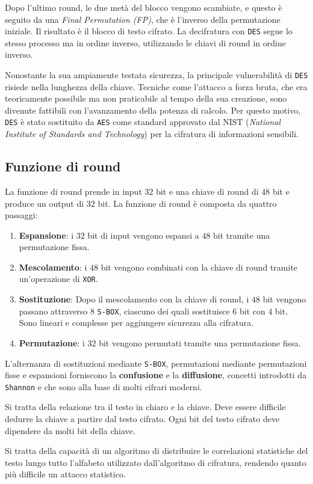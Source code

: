 Dopo l'ultimo round, le due metà del blocco vengono scambiate, e questo è seguito da una
\textit{Final Permutation (FP)}, che è l'inverso della permutazione iniziale. Il risultato
è il blocco di testo cifrato. La decifratura con \texttt{DES} segue lo stesso processo ma
in ordine inverso, utilizzando le chiavi di round in ordine inverso.

Nonostante la sua ampiamente testata sicurezza, la principale vulnerabilità di \texttt{DES}
risiede nella lunghezza della chiave. Tecniche come l'attacco a forza bruta, che era
teoricamente possibile ma non praticabile al tempo della sua creazione, sono divenute
fattibili con l'avanzamento della potenza di calcolo. Per questo motivo, \texttt{DES}
è stato sostituito da \texttt{AES} come standard approvato dal NIST (\textit{National
Institute of Standards and Technology}) per la cifratura di informazioni sensibili.
\subsection{Funzione di round}
La funzione di round prende in input $32$ bit e una chiave di round di $48$ bit e produce
un output di $32$ bit. La funzione di round è composta da quattro passaggi:
\begin{enumerate}
    \item \textbf{Espansione}: i $32$ bit di input vengono espansi a $48$ bit tramite una
    permutazione fissa.
    \item \textbf{Mescolamento}: i $48$ bit vengono combinati con la chiave di round tramite
    un'operazione di \texttt{XOR}.
    \item \textbf{Sostituzione}: Dopo il mescolamento con la chiave di round, i $48$ bit vengono
    passano attraverso $8$ \texttt{S-BOX}, ciascuno dei quali sostituisce $6$ bit con $4$ bit. 
    Sono lineari e complesse per aggiungere sicurezza alla cifratura.
    \item \textbf{Permutazione}: i $32$ bit vengono permutati tramite una permutazione fissa.
\end{enumerate}
L'alternanza di sostituzioni mediante \texttt{S-BOX}, permutazioni mediante permutazioni fisse
e espansioni forniscono la \textbf{confusione} e la \textbf{diffusione}, concetti introdotti
da \texttt{Shannon} e che sono alla base di molti cifrari moderni.

\begin{tcolorbox}[title=Confusione]
    Si tratta della relazione tra il testo in chiaro e la chiave. Deve essere difficile
    dedurre la chiave a partire dal testo cifrato. Ogni bit del testo cifrato deve
    dipendere da molti bit della chiave.
\end{tcolorbox}

\begin{tcolorbox}[title=Diffusione]
    Si tratta della capacità di un algoritmo di distribuire le correlazioni statistiche
    del testo lungo tutto l'alfabeto utilizzato dall'algoritmo di cifratura, rendendo quanto 
    più difficile un attacco statistico.
\end{tcolorbox}